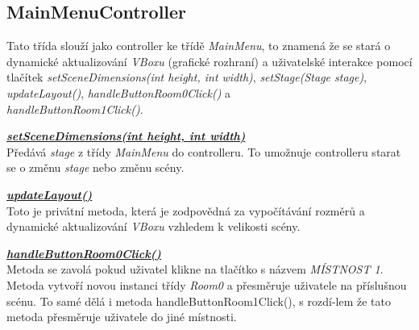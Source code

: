 \subsection{MainMenuController}
Tato třída slouží jako controller ke třídě \textit{MainMenu}, to znamená že se stará o dynamické aktualizování \textit{VBoxu} (grafické rozhraní) a uživatelské interakce pomocí tlačítek \textit{setSceneDimensions(int height, int width)}, \textit{setStage(Stage stage)}, \textit{updateLayout()}, \textit{handleButtonRoom0Click()} a \\
\textit{handleButtonRoom1Click()}. \newline

\underline{\textbf{\textit{setSceneDimensions(int height, int width)}}}\\
Předává \textit{stage} z třídy \textit{MainMenu} do controlleru. To umožnuje controlleru starat se o změnu \textit{stage} nebo změnu scény.

\vspace{0.3cm}

\underline{\textbf{\textit{updateLayout()}}}\\
Toto je privátní metoda, která je zodpovědná za vypočítávání rozměrů a dynamické aktualizování \textit{VBoxu} vzhledem k velikosti scény. 

\vspace{0.3cm}

\underline{\textbf{\textit{handleButtonRoom0Click()}}}\\
Metoda se zavolá pokud uživatel klikne na tlačítko s názvem \textit{MÍSTNOST 1}. Metoda vytvoří novou instanci třídy \textit{Room0} a přesměruje uživatele na příslušnou scénu. To samé dělá i metoda handleButtonRoom1Click(), s rozdí-lem že tato metoda přesměruje uživatele do jiné místnosti. 